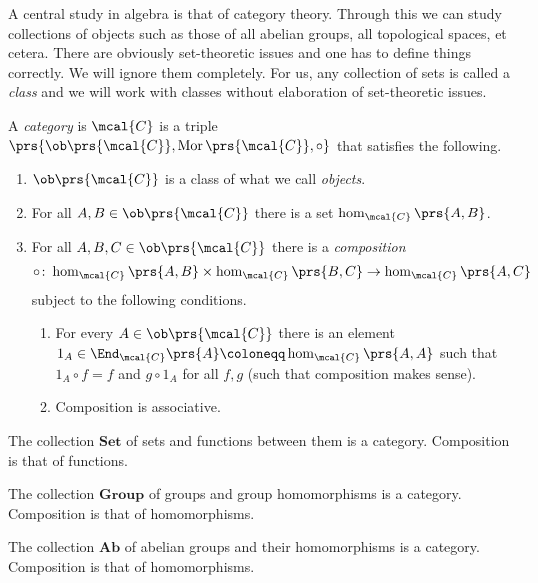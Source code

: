 \documentclass[11pt]{kbook}
\DeclareMathOperator{\Mor}{Mor}
\begin{document}
A central study in algebra is that of category theory. Through this we can study collections of objects such as those of all abelian groups, all topological spaces, et cetera.
There are obviously set-theoretic issues and one has to define things correctly. We will ignore them completely. For us, any collection of sets is called a \emph{class} and we will work with classes without elaboration of set-theoretic issues.

\begin{definition}[Category]
A \emph{category} is $\mcal{C}$ is a triple $\prs{\ob\prs{\mcal{C}}, \Mor\prs{\mcal{C}}, \circ}$ that satisfies the following.

\begin{enumerate}[label = (\roman*)]
\item $\ob\prs{\mcal{C}}$ is a class of what we call \emph{objects}.
\item For all $A,B \in \ob\prs{\mcal{C}}$ there is a set $\hom_{\mcal{C}}\prs{A,B}$.
\item For all $A,B,C \in \ob\prs{\mcal{C}}$ there is a \emph{composition}
\[\circ \colon \hom_{\mcal{C}}\prs{A,B} \times \hom_{\mcal{C}}\prs{B,C} \to \hom_{\mcal{C}}\prs{A,C}\]
subject to the following conditions.
\begin{enumerate}[label = (\Roman*)]
\item For every $A \in \ob\prs{\mcal{C}}$ there is an element $1_A \in \End_{\mcal{C}}\prs{A} \coloneqq \hom_{\mcal{C}}\prs{A,A}$ such that $1_A \circ f = f$ and $g \circ 1_A$ for all $f,g$ (such that composition makes sense).
\item Composition is associative.
\end{enumerate}
\end{enumerate}
\end{definition}

\begin{example}
The collection $\mathbf{Set}$ of sets and functions between them is a category. Composition is that of functions.
\end{example}

\begin{example}
The collection $\mathbf{Group}$ of groups and group homomorphisms is a category. Composition is that of homomorphisms.
\end{example}

\begin{example}[$\mathbf{Ab}$]
The collection $\mathbf{Ab}$ of abelian groups and their homomorphisms is a category. Composition is that of homomorphisms.
\end{example}
\end{document}
